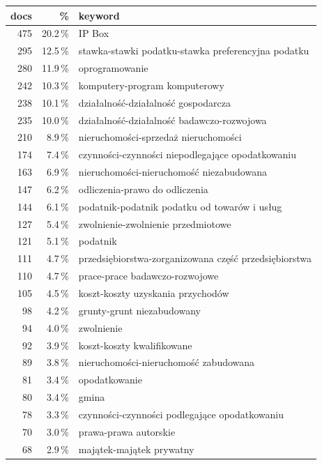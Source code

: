 \begin{table}[!htb]
\centering
\footnotesize
\begin{tabular}{@{}rrl@{}}
\toprule
\textbf{docs} & \textbf{\%} & \textbf{keyword} \\
\midrule
475 & 20.2\,\% & IP Box \\
295 & 12.5\,\% & stawka-stawki podatku-stawka preferencyjna podatku \\
280 & 11.9\,\% & oprogramowanie \\
242 & 10.3\,\% & komputery-program komputerowy \\
238 & 10.1\,\% & dzia\l{}alno\'s\'c-dzia\l{}alno\'s\'c gospodarcza \\
235 & 10.0\,\% & dzia\l{}alno\'s\'c-dzia\l{}alno\'s\'c badawczo-rozwojowa \\
210 &  8.9\,\% & nieruchomo\'sci-sprzeda\.z nieruchomo\'sci \\
174 &  7.4\,\% & czynno\'sci-czynno\'sci niepodlegaj\k{a}ce opodatkowaniu \\
163 &  6.9\,\% & nieruchomo\'sci-nieruchomo\'s\'c niezabudowana \\
147 &  6.2\,\% & odliczenia-prawo do odliczenia \\
144 &  6.1\,\% & podatnik-podatnik podatku od towar\'ow i us\l{}ug \\
127 &  5.4\,\% & zwolnienie-zwolnienie przedmiotowe \\
121 &  5.1\,\% & podatnik \\
111 &  4.7\,\% & przedsi\k{e}biorstwa-zorganizowana cz\k{e}\'s\'c przedsi\k{e}biorstwa \\
110 &  4.7\,\% & prace-prace badawczo-rozwojowe \\
105 &  4.5\,\% & koszt-koszty uzyskania przychod\'ow \\
 98 &  4.2\,\% & grunty-grunt niezabudowany \\
 94 &  4.0\,\% & zwolnienie \\
 92 &  3.9\,\% & koszt-koszty kwalifikowane \\
 89 &  3.8\,\% & nieruchomo\'sci-nieruchomo\'s\'c zabudowana \\
 81 &  3.4\,\% & opodatkowanie \\
 80 &  3.4\,\% & gmina \\
 78 &  3.3\,\% & czynno\'sci-czynno\'sci podlegaj\k{a}ce opodatkowaniu \\
 70 &  3.0\,\% & prawa-prawa autorskie \\
 68 &  2.9\,\% & maj\k{a}tek-maj\k{a}tek prywatny \\

\end{tabular}
\end{table}
